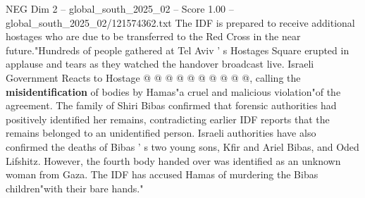 \begin{textsample}{NEG Dim 2 – global\_south\_2025\_02 – Score 1.00 – global\_south\_2025\_02/121574362.txt}
The IDF is prepared to receive additional hostages who are due to be transferred to the Red Cross in the near future."Hundreds of people gathered at Tel Aviv ' s Hostages Square erupted in applause and tears as they watched the handover broadcast live.
Israeli Government Reacts to Hostage @ @ @ @ @ @ @ @ @ @, calling the \textbf{misidentification} of bodies by Hamas"a cruel and malicious violation"of the agreement.
The family of Shiri Bibas confirmed that forensic authorities had positively identified her remains, contradicting earlier IDF reports that the remains belonged to an unidentified person.
Israeli authorities have also confirmed the deaths of Bibas ' s two young sons, Kfir and Ariel Bibas, and Oded Lifshitz.
However, the fourth body handed over was identified as an unknown woman from Gaza.
The IDF has accused Hamas of murdering the Bibas children"with their bare hands."

\end{textsample}
